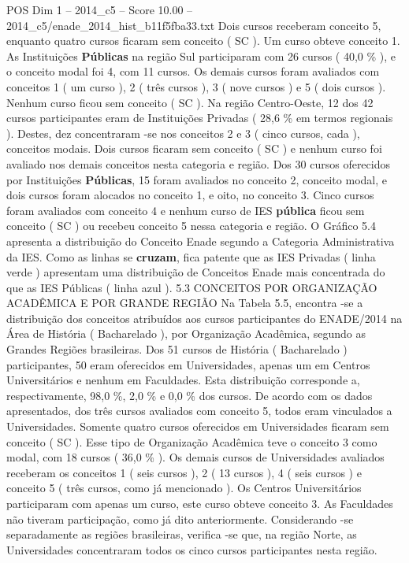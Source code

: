 \begin{textsample}{POS Dim 1 – 2014\_c5 – Score 10.00 – 2014\_c5/enade\_2014\_hist\_b11f5fba33.txt}
Dois cursos receberam conceito 5, enquanto quatro cursos ficaram sem conceito ( SC ).
Um curso obteve conceito 1.
As Instituições \textbf{Públicas} na região Sul participaram com 26 cursos ( 40,0 \% ), e o conceito modal foi 4, com 11 cursos.
Os demais cursos foram avaliados com conceitos 1 ( um curso ), 2 ( três cursos ), 3 ( nove cursos ) e 5 ( dois cursos ).
Nenhum curso ficou sem conceito ( SC ).
Na região Centro-Oeste, 12 dos 42 cursos participantes eram de Instituições Privadas ( 28,6 \% em termos regionais ).
Destes, dez concentraram -se nos conceitos 2 e 3 ( cinco cursos, cada ), conceitos modais.
Dois cursos ficaram sem conceito ( SC ) e nenhum curso foi avaliado nos demais conceitos nesta categoria e região.
Dos 30 cursos oferecidos por Instituições \textbf{Públicas}, 15 foram avaliados no conceito 2, conceito modal, e dois cursos foram alocados no conceito 1, e oito, no conceito 3.
Cinco cursos foram avaliados com conceito 4 e nenhum curso de IES \textbf{pública} ficou sem conceito ( SC ) ou recebeu conceito 5 nessa categoria e região.
O Gráfico 5.4 apresenta a distribuição do Conceito Enade segundo a Categoria Administrativa da IES.
Como as linhas se \textbf{cruzam}, fica patente que as IES Privadas ( linha verde ) apresentam uma distribuição de Conceitos Enade mais concentrada do que as IES Públicas ( linha azul ). 5.3 CONCEITOS POR ORGANIZAÇÃO ACADÊMICA E POR GRANDE REGIÃO Na Tabela 5.5, encontra -se a distribuição dos conceitos atribuídos aos cursos participantes do ENADE/2014 na Área de História ( Bacharelado ), por Organização Acadêmica, segundo as Grandes Regiões brasileiras.
Dos 51 cursos de História ( Bacharelado ) participantes, 50 eram oferecidos em Universidades, apenas um em Centros Universitários e nenhum em Faculdades.
Esta distribuição corresponde a, respectivamente, 98,0 \%, 2,0 \% e 0,0 \% dos cursos.
De acordo com os dados apresentados, dos três cursos avaliados com conceito 5, todos eram vinculados a Universidades.
Somente quatro cursos oferecidos em Universidades ficaram sem conceito ( SC ).
Esse tipo de Organização Acadêmica teve o conceito 3 como modal, com 18 cursos ( 36,0 \% ).
Os demais cursos de Universidades avaliados receberam os conceitos 1 ( seis cursos ), 2 ( 13 cursos ), 4 ( seis cursos ) e conceito 5 ( três cursos, como já mencionado ).
Os Centros Universitários participaram com apenas um curso, este curso obteve conceito 3.
As Faculdades não tiveram participação, como já dito anteriormente.
Considerando -se separadamente as regiões brasileiras, verifica -se que, na região Norte, as Universidades concentraram todos os cinco cursos participantes nesta região.

\end{textsample}
